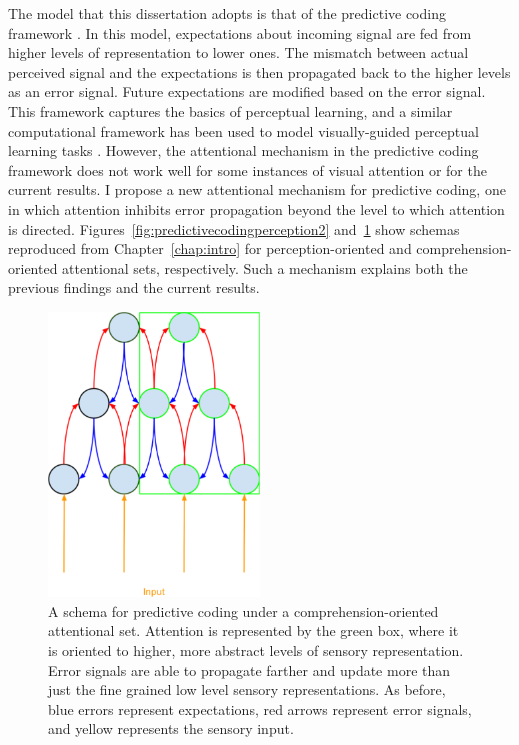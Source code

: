 The model that this dissertation adopts is that of the predictive coding framework \citep{Clark2013}.
In this model, expectations about incoming signal are fed from higher levels of representation to lower ones.
The mismatch between actual perceived signal and the expectations is then propagated back to the higher levels as an error signal.
Future expectations are modified based on the error signal.
This framework captures the basics of perceptual learning, and a similar computational framework has been used to model visually-guided perceptual learning tasks \citep{Kleinschmidt2011}.
However, the attentional mechanism in the predictive coding framework does not work well for some instances of visual attention \citep{Block2013} or for the current results.
I propose a new attentional mechanism for predictive coding, one in which attention inhibits error propagation beyond the level to which attention is directed.
Figures~\ref{fig:predictivecodingperception2} and~\ref{fig:predictivecodingcomprehension2} show schemas reproduced from Chapter~\ref{chap:intro} for perception-oriented and comprehension-oriented attentional sets, respectively.
Such a mechanism explains both the previous findings and the current results.

\begin{figure}[!ht]
\caption{A schema for predictive coding under a comprehension-oriented attentional set. Attention is represented by the green box, where it is oriented to higher, more abstract levels of sensory representation.  Error signals are able to propagate farther and update more than just the fine grained low level sensory representations. As before, blue errors represent expectations, red arrows represent error signals, and yellow represents the sensory input.}
\label{fig:predictivecodingcomprehension2}
\begin{center}
\includegraphics[width=0.5\textwidth]{pictures/comprehension_predictive_coding}
\end{center}
\end{figure}

